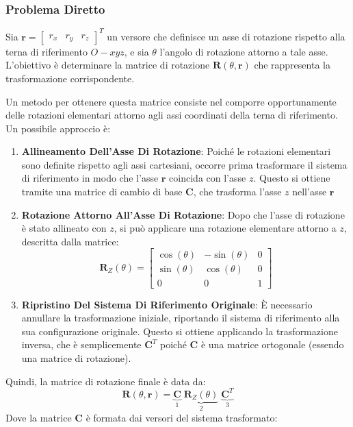 \documentclass[11pt, a4paper]{report}
\begin{document}
\subsubsection{Problema Diretto}

Sia \(\mathbf{r} = \begin{bmatrix} r_x & r_y & r_z \end{bmatrix}^{T}\) un versore che definisce un asse di rotazione rispetto alla terna di riferimento \(O{-}xyz\), e sia \(\theta\) l'angolo di rotazione attorno a tale asse. L'obiettivo è determinare la matrice di rotazione \(\mathbf{R}(\theta, \mathbf{r})\) che rappresenta la trasformazione corrispondente.

Un metodo per ottenere questa matrice consiste nel comporre opportunamente delle rotazioni elementari attorno agli assi coordinati della terna di riferimento. Un possibile approccio è:

\begin{enumerate}
    \item \textbf{Allineamento Dell'Asse Di Rotazione}: Poiché le rotazioni elementari sono definite rispetto agli assi cartesiani, occorre prima trasformare il sistema di riferimento in modo che l'asse \(\mathbf{r}\) coincida con l'asse \(z\). Questo si ottiene tramite una matrice di cambio di base \(\mathbf{C}\), che trasforma l'asse \(z\) nell'asse \(\mathbf{r}\)

    \item \textbf{Rotazione Attorno All'Asse Di Rotazione}: Dopo che l'asse di rotazione è stato allineato con \(z\), si può applicare una rotazione elementare attorno a \(z\), descritta dalla matrice:
    \[
       \mathbf{R}_Z(\theta) =
       \begin{bmatrix}
           \cos(\theta) & -\sin(\theta) & 0 \\
           \sin(\theta) &  \cos(\theta) & 0 \\
           0 & 0 & 1
       \end{bmatrix}
    \]

    \item \textbf{Ripristino Del Sistema Di Riferimento Originale}: È necessario annullare la trasformazione iniziale, riportando il sistema di riferimento alla sua configurazione originale. Questo si ottiene applicando la trasformazione inversa, che è semplicemente \(\mathbf{C}^{T}\) poiché \(\mathbf{C}\) è una matrice ortogonale (essendo una matrice di rotazione).
\end{enumerate}
\newpage
Quindi, la matrice di rotazione finale è data da:
\[
    \mathbf{R}(\theta, \mathbf{r}) = \underbrace{\mathbf{C}}_{1} \; \underbrace{\mathbf{R}_Z(\theta)}_{2} \; \underbrace{\mathbf{C}^{T}}_{3}
\]
Dove la matrice \(\mathbf{C}\) è formata dai versori del sistema trasformato:
\end{document}
